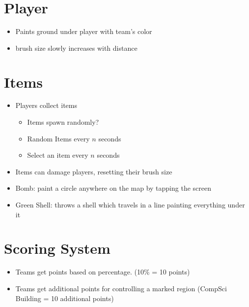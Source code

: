 \documentclass[oneside,12pt]{scrbook}
\begin{document}
\section{Player}
\begin{itemize}
    \item Paints ground under player with team's color
    \item brush size slowly increases with distance
\end{itemize}

\section{Items}
\begin{itemize}
    \item Players collect items
        \begin{itemize}
            \item Items spawn randomly?
            \item Random Items every $n$ seconds
            \item Select an item every $n$ seconds
        \end{itemize}
    \item Items can damage players, resetting their brush size
    \item Bomb: paint a circle anywhere on the map by tapping the screen
    \item Green Shell: throws a shell which travels in a line painting everything under it
\end{itemize}

\section{Scoring System}
\begin{itemize}
    \item Teams get points based on percentage. (10\% = 10 points)
    \item Teams get additional points for controlling a marked region (CompSci Building = 10 additional points)
\end{itemize}
\end{document}
